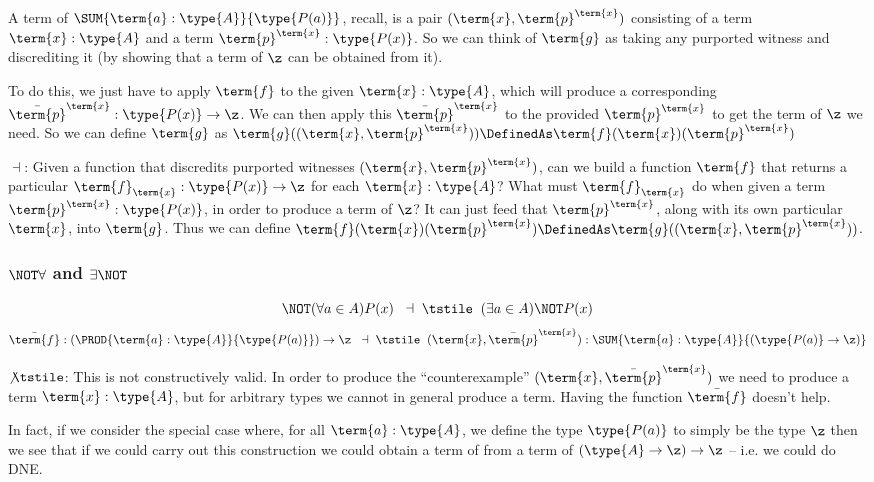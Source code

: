 A term of 
$\SUM{\term{a}:\type{A}}{\type{P(a)}}$, 
recall, is a pair $(\term{x}, \term{p}^{\term{x}})$ consisting of a term $\term{x}:\type{A}$ 
and a term $\term{p}^{\term{x}}:\type{P(x)}$.  So we can think of  $\term{g}$ as taking any purported witness and discrediting it (by showing that a term of $\z$ can be obtained from it).

To do this, we just have to apply $\term{f}$ to the given $\term{x}:\type{A}$, which will produce a corresponding 
$\bar{\term{p}}^{\term{x}}: \type{P(x)} \to \z$.  We can then apply this 
$\bar{\term{p}}^{\term{x}}$ to the provided $\term{p}^{\term{x}}$ to get the term of $\z$ we need.  So we can define $\term{g}$ as 
$\term{g}((\term{x}, \term{p}^{\term{x}})) \DefinedAs 
\term{f}(\term{x})(\term{p}^{\term{x}})$



$\dashv$: Given a function  that discredits purported witnesses $(\term{x},\term{p}^{\term{x}})$, can we build a function $\term{f}$ that returns a particular $\term{f}_{\term{x}}: \type{P(x)} \to \z$ for each $\term{x}:\type{A}$?  What must $\term{f}_{\term{x}}$ do when given a term $\term{p}^{\term{x}}:\type{P(x)}$, in order to produce a term of $\z$?  It can just feed that $\term{p}^{\term{x}}$, along with its own particular $\term{x}$, into $\term{g}$.  Thus we can define
$\term{f}(\term{x})(\term{p}^{\term{x}})
 \DefinedAs 
\term{g}((\term{x}, \term{p}^{\term{x}}))$.




\subsubsection{$\NOT\forall$ and $\exists \NOT$}

\[
\NOT(\forall a \in A) P(x)
\;\; \dashv \; \tstile 	\;\; 
(\exists a \in A) \NOT P(x)
\]
\[
\bar{\term{f}}:
\left(
\PROD
{\term{a}:\type{A}}
{\type{P(a)}}
\right) \to \z
\;\; \dashv \; \tstile 	\;\; 
(\term{x}, \bar{\term{p}}^{\term{x}}):
\SUM{\term{a}:\type{A}}
{(\type{P(a)} \to \z)}
\]

$\not\tstile$:  This is not constructively valid.  In order to produce the ``counterexample'' $(\term{x}, \bar{\term{p}}^{\term{x}})$ we need to produce a term $\term{x}:\type{A}$, but for arbitrary types we cannot in general produce a term.  Having the function $\bar{\term{f}}$ doesn't help.

In fact, if we consider the special case where, for all $\term{a}:\type{A}$, we define the type $\type{P(a)}$ to simply be the type $\z$ then we see that if we could carry out this construction we could obtain a term of  from a term of $(\type{A} \to \z) \to \z$ -- i.e. we could do DNE.

